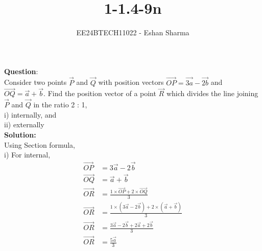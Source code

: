 \documentclass[journal]{IEEEtran}
\begin{document}

\vspace{3cm}

\title{1-1.4-9n}
\author{EE24BTECH11022 - Eshan Sharma
}
{\let\newpage\relax\maketitle}

\renewcommand{\thefigure}{\theenumi}
\renewcommand{\thetable}{\theenumi}
\setlength{\intextsep}{10pt} %


\renewcommand{\thetable}{\theenumi}


\textbf{Question}:\\
Consider two points $\vec{P}$ and $\vec{Q}$ with position vectors $\overrightarrow{OP} = \overrightarrow{3a} - \overrightarrow{2b}$ and $\overrightarrow{OQ} = \overrightarrow{a} + \overrightarrow{b}$. Find the position vector of a point $\vec{R}$ which divides the line joining $\vec{P}$ and $\vec{Q}$ in the ratio 2 : 1, \\ 
i) internally, and \\
ii) externally
\\
\textbf{Solution:}\\
Using Section formula, \\
i) For internal,\\
\begin{align*}
\overrightarrow{OP} &= 3\overrightarrow{a} - 2\overrightarrow{b} \\
\overrightarrow{OQ} &= \overrightarrow{a} + \overrightarrow{b} \\
\overrightarrow{OR} &= \frac{1 \times \overrightarrow{OP} + 2 \times \overrightarrow{OQ}}{3} \\
\overrightarrow{OR} &= \frac{1 \times (3\overrightarrow{a} - 2\overrightarrow{b}) + 2 \times (\overrightarrow{a} + \overrightarrow{b})}{3} \\
\overrightarrow{OR} &= \frac{3\overrightarrow{a} - 2\overrightarrow{b} + 2\overrightarrow{a} + 2\overrightarrow{b}}{3} \\
\overrightarrow{OR} &= \frac{5\overrightarrow{a}}{3}
\end{align*}
\end{document}
